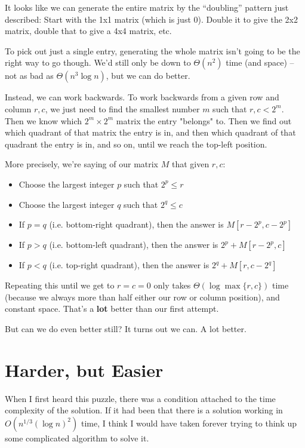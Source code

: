 \documentclass[11pt]{article}
\begin{document}
It looks like we can generate the entire matrix by the ``doubling'' pattern just described: Start with the 1x1 matrix (which is just 0). Double it to give the 2x2 matrix, double that to give a 4x4 matrix, etc.

To pick out just a single entry, generating the whole matrix isn't going to be the right way to go though. We'd still only be down to $\Theta(n^2)$ time (and space) -- not as bad as $\Theta(n^3 \log n)$, but we can do better.

Instead, we can work backwards. To work backwards from a given row and column $r, c$, we just need to find the smallest number $m$ such that $r, c < 2^m$. Then we know which $2^m \times 2^m$ matrix the entry "belongs" to. Then we find out which quadrant of that matrix the entry is in, and then which quadrant of that quadrant the entry is in, and so on, until we reach the top-left position.

More precisely, we're saying of our matrix $M$ that given $r, c$:
\begin{itemize}
\item Choose the largest integer $p$ such that $2^p \leq r$
\item Choose the largest integer $q$ such that $2^q \leq c$
\item If $p = q$ (i.e. bottom-right quadrant), then the answer is $M[r - 2^p, c - 2^p]$
\item If $p > q$ (i.e. bottom-left quadrant), then the answer is $2^p + M[r - 2^p, c]$
\item If $p < q$ (i.e. top-right quadrant), then the answer is $2^q + M[r, c - 2^q]$
\end{itemize}

Repeating this until we get to $r = c = 0$ only takes $\Theta(\log \max\lbrace r, c\rbrace)$ time (because we always more than half either our row or column position), and constant space. That's a \textbf{lot} better than our first attempt.

But can we do even better still? It turns out we can. A lot better.
\section{Harder, but Easier}

When I first heard this puzzle, there was a condition attached to the time complexity of the solution. If it had been that there is a solution working in $O(n^{1/3}(\log n)^2)$ time, I think I would have taken forever trying to think up some complicated algorithm to solve it.
\end{document}
